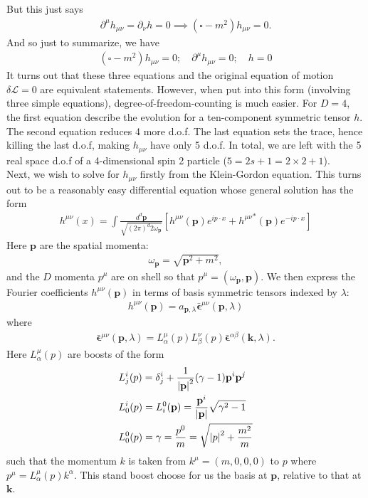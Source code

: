 \documentclass{book}
\theoremstyle{definition}
\newcommand{\p}{\partial}
\newcommand{\lag}{\mathcal{L}}
\newcommand{\nn}{\nonumber}
\newcommand{\f}[2]{\frac{#1}{#2}}
\newcommand{\lb}{\left[}
\newcommand{\rb}{\right]}
\begin{document}
But this just says
\begin{align}
\p^\mu h_{\mu\nu} = \p_\nu h = 0 \implies (\square - m^2)h_{\mu\nu} = 0.
\end{align}
And so just to summarize, we have
\begin{align}
\boxed{(\square - m^2)h_{\mu\nu} = 0; \quad \p^\mu h_{\mu\nu} = 0; \quad h = 0}
\end{align}
It turns out that these three equations and the original equation of motion $\delta \lag = 0$ are equivalent statements. However, when put into this form (involving three simple equations), degree-of-freedom-counting is much easier. For $D = 4$, the first equation describe the evolution for a ten-component symmetric tensor $h$. The second equation reduces 4 more d.o.f. The last equation sets the trace, hence killing the last d.o.f, making $h_{\mu\nu}$ have only 5 d.o.f. In total, we are left with the 5 real space d.o.f of a 4-dimensional spin 2 particle ($5 = 2s+1 = 2\times 2 + 1$). \\

Next, we wish to solve for $h_{\mu\nu}$ firstly from the Klein-Gordon equation. This turns out to be a reasonably easy differential equation whose general solution has the form
\begin{align}
\boxed{h^{\mu\nu}(x) = \int \f{d^d\mathbf{p}}{\sqrt{(2\pi)^d 2\omega_\mathbf{p}}} \lb h^{\mu\nu}(\mathbf{p})e^{ip\cdot x} + {h^{\mu\nu}}^*(\mathbf{p})e^{-ip\cdot x}\rb}
\end{align}  
Here $\mathbf{p}$ are the spatial momenta:
\begin{align}
\omega_\mathbf{p} = \sqrt{\mathbf{p}^2 +m^2},
\end{align}
and the $D$ momenta $p^\mu$ are on shell so that $p^\mu =(\omega_\mathbf{p}, \mathbf{p})$. We then express the Fourier coefficients $h^{\mu\nu}(\mathbf{p})$ in terms of basis symmetric tensors indexed by $\lambda$:
\begin{align}
h^{\mu\nu}(\mathbf{p}) = a_{\mathbf{p},\lambda}\bar{\mathbf{\epsilon}}^{\mu\nu}(\mathbf{p},\lambda)
\end{align}
where
\begin{align}
\bar{\mathbf{\epsilon}}^{\mu\nu}(\mathbf{p},\lambda) = L^\mu_\alpha(p)L^\nu_\beta(p)\bar{\mathbf{\epsilon}}^{\alpha\beta}(\mathbf{k},\lambda).
\end{align}
Here $L^\mu_\alpha(p)$ are boosts of the form
\begin{align}
&L^i_j(p) = \delta^i_j + \f{1}{\abs{\mathbf{p}}^2}(\gamma - 1)\mathbf{p}^i\mathbf{p}^j\nn\\
&L^i_0(p) = L^0_i(\mathbf{p}) = \f{\mathbf{p}^i}{\abs{\mathbf{p}}}\sqrt{\gamma^2 - 1}\nn\\
&L^0_0(p) = \gamma = \f{p^0}{m}  = \sqrt{\abs{p}^2 + \f{m^2}{m}}
\end{align}
such that the momentum $k$ is taken from $k^\mu = (m,0,0,0)$ to $p$ where $p^\mu = L^\mu_\alpha(p) k^\alpha$. This stand boost choose for us the basis at $\mathbf{p}$, relative to that at $\mathbf{k}$. \\
\end{document}

